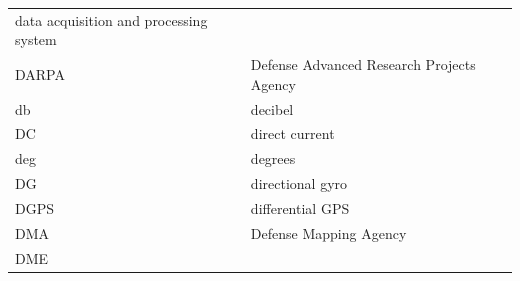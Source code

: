 \documentclass[
]{book}
\begin{document}
\begin{longtable}[]{@{}ll@{}}
\begin{minipage}[t]{0.47\columnwidth}
data acquisition and processing system\strut
\end{minipage}\tabularnewline
\begin{minipage}[t]{0.47\columnwidth}\raggedright
DARPA\strut
\end{minipage} & \begin{minipage}[t]{0.47\columnwidth}\raggedright
Defense Advanced Research Projects Agency\strut
\end{minipage}\tabularnewline
\begin{minipage}[t]{0.47\columnwidth}\raggedright
db\strut
\end{minipage} & \begin{minipage}[t]{0.47\columnwidth}\raggedright
decibel\strut
\end{minipage}\tabularnewline
\begin{minipage}[t]{0.47\columnwidth}\raggedright
DC\strut
\end{minipage} & \begin{minipage}[t]{0.47\columnwidth}\raggedright
direct current\strut
\end{minipage}\tabularnewline
\begin{minipage}[t]{0.47\columnwidth}\raggedright
deg\strut
\end{minipage} & \begin{minipage}[t]{0.47\columnwidth}\raggedright
degrees\strut
\end{minipage}\tabularnewline
\begin{minipage}[t]{0.47\columnwidth}\raggedright
DG\strut
\end{minipage} & \begin{minipage}[t]{0.47\columnwidth}\raggedright
directional gyro\strut
\end{minipage}\tabularnewline
\begin{minipage}[t]{0.47\columnwidth}\raggedright
DGPS\strut
\end{minipage} & \begin{minipage}[t]{0.47\columnwidth}\raggedright
differential GPS\strut
\end{minipage}\tabularnewline
\begin{minipage}[t]{0.47\columnwidth}\raggedright
DMA\strut
\end{minipage} & \begin{minipage}[t]{0.47\columnwidth}\raggedright
Defense Mapping Agency\strut
\end{minipage}\tabularnewline
\begin{minipage}[t]{0.47\columnwidth}\raggedright
DME\strut

\end{minipage}
\end{longtable}
\end{document}
